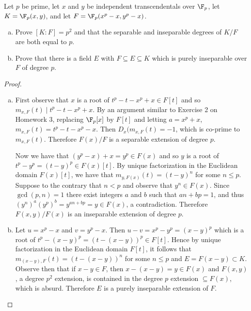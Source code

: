 \documentclass[10pt]{amsart}
\begin{document}
\begin{thm}
  Let $p$ be prime, let $x$ and $y$ be independent transcendentals over $\F_p$, let $K = \F_p(x,y)$, and let $F = \F_p(x^p - x, y^p - x)$.
  \begin{enumerate}[(a)]
  \item
    Prove $[K : F] = p^2$ and that the separable and inseparable degrees of $K/F$ are both equal to $p$.
  \item
    Prove that there is a field $E$ with $F \subseteq E \subseteq K$ which is purely inseparable over $F$ of degree $p$.
  \end{enumerate}

  \begin{proof}
    \begin{enumerate}[(a)]
    \item
      First observe that $x$ is a root of $t^p - t - x^p + x \in F[t]$ and so $m_{x, F}(t) \mid t^p - t - x^p + x$.
      By an argument similar to Exercise 2 on Homework 3, replacing $\F_p[x]$ by $F[t]$ and letting $a = x^p + x$, $m_{x, F}(t) = t^p - t - x^p - x$.
      Then $D_x(m_{x,F}(t) = -1$, which is co-prime to $m_{x,F}(t)$.
      Therefore $F(x)/F$ is a separable extension of degree $p$.
      
      Now we have that $(y^p - x) + x = y^p \in F(x)$ and so $y$ is a root of $t^p - y^p = (t - y)^p \in F(x)[t]$.
      By unique factorization in the Euclidean domain $F(x)[t]$, we have that $m_{y, F(x)}(t) = (t - y)^n$ for some $n \leq p$.
      Suppose to the contrary that $n < p$ and observe that $y^n \in F(x)$.
      Since $\gcd(p,n) = 1$ there exist integers $a$ and $b$ such that $an + bp = 1$, and thus $(y^n)^a(y^p)^b = y^{an + bp} = y \in F(x)$, a contradiction.
      Therefore $F(x,y)/F(x)$ is an inseparable extension of degree $p$. 
    \item
      Let $u = x^p - x$ and $v = y^p - x$.
      Then $u - v = x^p - y^p = (x - y)^p$ which is a root of $t^p - (x - y)^p = (t - (x - y))^p \in F[t]$.
      Hence by unique factorization in the Euclidean domain $F[t]$, it follows that $m_{(x-y), F}(t) = (t - (x - y))^n$ for some $n \leq p$ and $E = F(x - y) \subset K$.
      Observe then that if $x - y \in F$, then $x - (x - y) = y \in F(x)$ and $F(x,y)$, a degree $p^2$ extension, is contained in the degree $p$ extension $\subseteq F(x)$, which is absurd.
      Therefore $E$ is a purely inseparable extension of $F$.
    \end{enumerate}
  \end{proof}
\end{thm}
\end{document}
